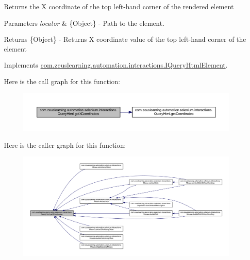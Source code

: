 Returns the X coordinate of the top left-\/hand corner of the rendered element


\begin{DoxyParams}{Parameters}
{\em locator} & \{Object\} -\/ Path to the element. \\
\hline
\end{DoxyParams}
\begin{DoxyReturn}{Returns}
\{Object\} -\/ Returns X coordinate value of the top left-\/hand corner of the element 
\end{DoxyReturn}


Implements \hyperlink{interfacecom_1_1zeuslearning_1_1automation_1_1interactions_1_1IQueryHtmlElement_a5c04301a20d28108814175e83ea6e939}{com.\+zeuslearning.\+automation.\+interactions.\+I\+Query\+Html\+Element}.

Here is the call graph for this function\+:
\nopagebreak
\begin{figure}[H]
\begin{center}
\leavevmode
\includegraphics[width=350pt]{dc/d41/classcom_1_1zeuslearning_1_1automation_1_1selenium_1_1interactions_1_1QueryHtml_a093e239edd8567248e9407a4cef24474_cgraph}
\end{center}
\end{figure}
Here is the caller graph for this function\+:
\nopagebreak
\begin{figure}[H]
\begin{center}
\leavevmode
\includegraphics[width=350pt]{dc/d41/classcom_1_1zeuslearning_1_1automation_1_1selenium_1_1interactions_1_1QueryHtml_a093e239edd8567248e9407a4cef24474_icgraph}
\end{center}
\end{figure}
\hypertarget{classcom_1_1zeuslearning_1_1automation_1_1selenium_1_1interactions_1_1QueryHtml_a3809f347197437c4f02974ac8a69637d}{}\label{classcom_1_1zeuslearning_1_1automation_1_1selenium_1_1interactions_1_1QueryHtml_a3809f347197437c4f02974ac8a69637d} 

